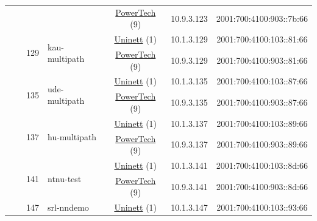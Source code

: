 \begin{small}
\begin{center}
\begin{longtable}{|c|c|c|c|c|c|c|c|}
  &  &  &  & \multicolumn{2}{|c|}{\tiny{\href{http://www.powertech.no}{PowerTech} (9)}} & \tiny{10.9.3.123} & \tiny{2001:700:4100:903::7b:66} \\* \cline{3-3}\cline{4-4}\cline{5-5}\cline{6-6}\cline{7-7}\cline{8-8}
  &  & \multirow{2}{*}{\tiny{129}} & \multicolumn{1}{|l|}{\multirow{2}{*}{\tiny{kau-multipath}}} & \multicolumn{2}{|c|}{\tiny{\href{https://www.uninett.no}{Uninett} (1)}} & \tiny{10.1.3.129} & \tiny{2001:700:4100:103::81:66} \\* \cline{5-5}\cline{6-6}\cline{7-7}\cline{8-8}
  &  &  &  & \multicolumn{2}{|c|}{\tiny{\href{http://www.powertech.no}{PowerTech} (9)}} & \tiny{10.9.3.129} & \tiny{2001:700:4100:903::81:66} \\* \cline{3-3}\cline{4-4}\cline{5-5}\cline{6-6}\cline{7-7}\cline{8-8}
  &  & \multirow{2}{*}{\tiny{135}} & \multicolumn{1}{|l|}{\multirow{2}{*}{\tiny{ude-multipath}}} & \multicolumn{2}{|c|}{\tiny{\href{https://www.uninett.no}{Uninett} (1)}} & \tiny{10.1.3.135} & \tiny{2001:700:4100:103::87:66} \\* \cline{5-5}\cline{6-6}\cline{7-7}\cline{8-8}
  &  &  &  & \multicolumn{2}{|c|}{\tiny{\href{http://www.powertech.no}{PowerTech} (9)}} & \tiny{10.9.3.135} & \tiny{2001:700:4100:903::87:66} \\* \cline{3-3}\cline{4-4}\cline{5-5}\cline{6-6}\cline{7-7}\cline{8-8}
  &  & \multirow{2}{*}{\tiny{137}} & \multicolumn{1}{|l|}{\multirow{2}{*}{\tiny{hu-multipath}}} & \multicolumn{2}{|c|}{\tiny{\href{https://www.uninett.no}{Uninett} (1)}} & \tiny{10.1.3.137} & \tiny{2001:700:4100:103::89:66} \\* \cline{5-5}\cline{6-6}\cline{7-7}\cline{8-8}
  &  &  &  & \multicolumn{2}{|c|}{\tiny{\href{http://www.powertech.no}{PowerTech} (9)}} & \tiny{10.9.3.137} & \tiny{2001:700:4100:903::89:66} \\* \cline{3-3}\cline{4-4}\cline{5-5}\cline{6-6}\cline{7-7}\cline{8-8}
  &  & \multirow{2}{*}{\tiny{141}} & \multicolumn{1}{|l|}{\multirow{2}{*}{\tiny{ntnu-test}}} & \multicolumn{2}{|c|}{\tiny{\href{https://www.uninett.no}{Uninett} (1)}} & \tiny{10.1.3.141} & \tiny{2001:700:4100:103::8d:66} \\* \cline{5-5}\cline{6-6}\cline{7-7}\cline{8-8}
  &  &  &  & \multicolumn{2}{|c|}{\tiny{\href{http://www.powertech.no}{PowerTech} (9)}} & \tiny{10.9.3.141} & \tiny{2001:700:4100:903::8d:66} \\* \cline{3-3}\cline{4-4}\cline{5-5}\cline{6-6}\cline{7-7}\cline{8-8}
  &  & \multirow{2}{*}{\tiny{147}} & \multicolumn{1}{|l|}{\multirow{2}{*}{\tiny{srl-nndemo}}} & \multicolumn{2}{|c|}{\tiny{\href{https://www.uninett.no}{Uninett} (1)}} & \tiny{10.1.3.147} & \tiny{2001:700:4100:103::93:66} \\* \cline{5-5}\cline{6-6}\cline{7-7}\cline{8-8}

\end{longtable}
\end{center}
\end{small}
